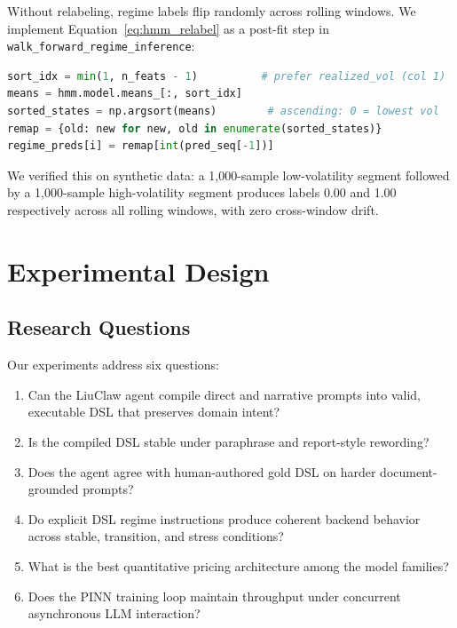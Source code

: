 \documentclass[11pt,a4paper]{article}
\begin{document}
Without relabeling, regime labels flip randomly across rolling windows. We implement Equation~\eqref{eq:hmm_relabel} as a post-fit step in \texttt{walk\_forward\_regime\_inference}:

\begin{lstlisting}[language=Python]
sort_idx = min(1, n_feats - 1)          # prefer realized_vol (col 1)
means = hmm.model.means_[:, sort_idx]
sorted_states = np.argsort(means)        # ascending: 0 = lowest vol
remap = {old: new for new, old in enumerate(sorted_states)}
regime_preds[i] = remap[int(pred_seq[-1])]
\end{lstlisting}

We verified this on synthetic data: a 1,000-sample low-volatility segment followed by a 1,000-sample high-volatility segment produces labels 0.00 and 1.00 respectively across all rolling windows, with zero cross-window drift.

\section{Experimental Design}
\label{sec:experiments}

\subsection{Research Questions}

Our experiments address six questions:
\begin{enumerate}
  \item Can the LiuClaw agent compile direct and narrative prompts into valid, executable DSL that preserves domain intent?
  \item Is the compiled DSL stable under paraphrase and report-style rewording?
  \item Does the agent agree with human-authored gold DSL on harder document-grounded prompts?
  \item Do explicit DSL regime instructions produce coherent backend behavior across stable, transition, and stress conditions?
  \item What is the best quantitative pricing architecture among the model families?
  \item Does the PINN training loop maintain throughput under concurrent asynchronous LLM interaction?
\end{enumerate}
\end{document}
